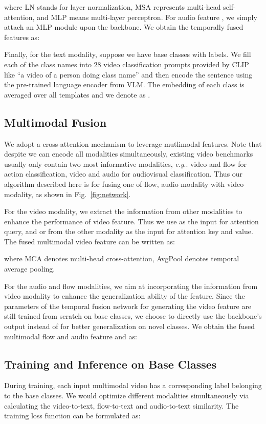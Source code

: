 \documentclass{article}
\makeatletter
\DeclareRobustCommand\onedot{\futurelet\@let@token\@onedot}
\def\@onedot{\ifx\@let@token.\else.\null\fi\xspace}
\def\eg{\emph{e.g}\onedot} \def\Eg{\emph{E.g}\onedot}
\makeatother
\begin{document}
where LN stands for layer normalization, MSA represents multi-head self-attention, and MLP means multi-layer perceptron. 
For audio feature , we simply attach an MLP module upon the backbone. We obtain the temporally fused features as:


Finally, for the text modality, suppose we have  base classes with labels. We fill each of the class names into 28 video classification prompts provided by CLIP~\cite{radford2021learning} like ``a video of a person doing class name'' and then encode the sentence using the pre-trained language encoder  from VLM. The embedding of each class is averaged over all templates and we denote as .


\subsection{Multimodal Fusion}
\label{subsec:mod_fusion}
We adopt a cross-attention mechanism to leverage mutlimodal features. Note that despite we can encode all modalities simultaneously, existing video benchmarks usually only contain two most informative modalities, \eg video and flow for action classification, video and audio for audiovisual classification. Thus our algorithm described here is for fusing one of flow, audio modality with video modality, as shown in Fig.~\ref{fig:network}. 

For the video modality, we extract the information from other modalities to enhance the performance of video feature. Thus we use  as the input for attention query, and  or  from the other modality as the input for attention key and value. The fused multimodal video feature  can be written as:


where MCA denotes multi-head cross-attention, AvgPool denotes temporal average pooling.

For the audio and flow modalities, we aim at incorporating the information from video modality to enhance the generalization ability of the feature. Since the parameters of the temporal fusion network  for generating the video feature  are still trained from scratch on base classes, we choose to directly use the backbone's output  instead of  for better generalization on novel classes. We obtain the fused multimodal flow and audio feature  and  as:



\subsection{Training and Inference on Base Classes}
\label{subsec:closeset}
During training, each input multimodal video has a corresponding label  belonging to the base classes. We would optimize different modalities simultaneously via calculating the video-to-text, flow-to-text and audio-to-text similarity. The training loss function can be formulated as:
\end{document}
